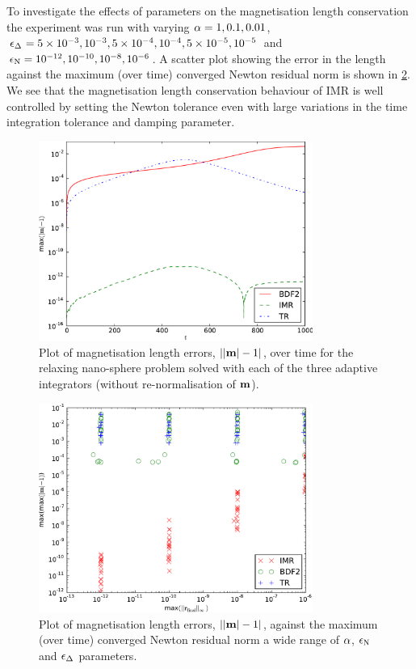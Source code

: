 To investigate the effects of parameters on the magnetisation length conservation the experiment was run with varying $\alpha=1, 0.1, 0.01$, $\epsilon_{\Delta_{}} = 5\times 10^{-3}, 10^{-3}, 5\times10^{-4}, 10^{-4}, 5\times10^{-5}, 10^{-5}$ and $\epsilon_{\mathrm{N}}=10^{-12}, 10^{-10}, 10^{-8}, 10^{-6}$.
A scatter plot showing the error in the length against the maximum (over time) converged Newton residual norm is shown in \cref{fig:ml-aimr-newton}.
We see that the magnetisation length conservation behaviour of IMR is well controlled by setting the Newton tolerance even with large variations in the time integration tolerance and damping parameter.

\begin{figure}
  \centering
  \includegraphics[width=0.8\textwidth]{plots/ode_llg_adaptive_ml/mlengtherrormaxesvstimes}
  \caption{Plot of magnetisation length errors, $\left|{\left|{\boldsymbol{\mathrm{m}}} \right| -1} \right|$, over time for the relaxing nano-sphere problem solved with each of the three adaptive integrators (without re-normalisation of $\boldsymbol{\mathrm{m}}$).}
  \label{fig:ml-aimr-ode}
\end{figure}

\begin{figure}
  \centering
  \includegraphics[width=0.8\textwidth]{plots/aimr_ode_llg_ml_sweep/maxofmlengtherrormaxesvsmaxminofnewtonresiduals.pdf}
  \caption{Plot of magnetisation length errors, $\left|{\left|{\boldsymbol{\mathrm{m}}} \right| -1} \right|$, against the maximum (over time) converged Newton residual norm a wide range of $\alpha$, $\epsilon_{\mathrm{N}}$ and $\epsilon_{\Delta_{}}$ parameters.}
  \label{fig:ml-aimr-newton}
\end{figure}

